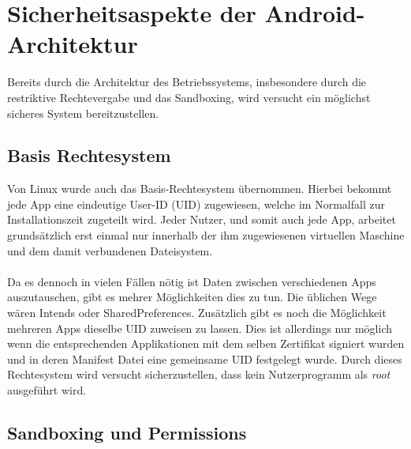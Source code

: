 \section{Sicherheitsaspekte der Android-Architektur}

	Bereits durch die Architektur des Betriebssystems, insbesondere durch die restriktive Rechtevergabe und das Sandboxing, wird versucht ein möglichst sicheres System bereitzustellen.

	\subsection{Basis Rechtesystem}\label{sec:BasisRechteSystem}
	Von Linux wurde auch das Basis-Rechtesystem übernommen. Hierbei bekommt jede App eine eindeutige User-ID (UID) zugewiesen, welche im Normalfall zur Installationszeit zugeteilt wird. Jeder Nutzer, und somit auch jede App, arbeitet grundsätzlich erst einmal nur innerhalb der ihm zugewiesenen virtuellen Maschine und dem damit verbundenen Dateisystem.\\\\
	Da es dennoch in vielen Fällen nötig ist Daten zwischen verschiedenen Apps auszutauschen, gibt es mehrer Möglichkeiten dies zu tun. Die üblichen Wege wären Intends oder SharedPreferences. Zusätzlich gibt es noch die Möglichkeit mehreren Apps dieselbe UID zuweisen zu lassen. Dies ist allerdings nur möglich wenn die entsprechenden Applikationen mit dem selben Zertifikat signiert wurden und in deren Manifest Datei eine gemeinsame UID festgelegt wurde.
	Durch dieses Rechtesystem wird versucht sicherzustellen, dass kein Nutzerprogramm als \textit{root} ausgeführt wird.
	
	\subsection{Sandboxing und Permissions} \label{sec:SandBoxingNPermissions}